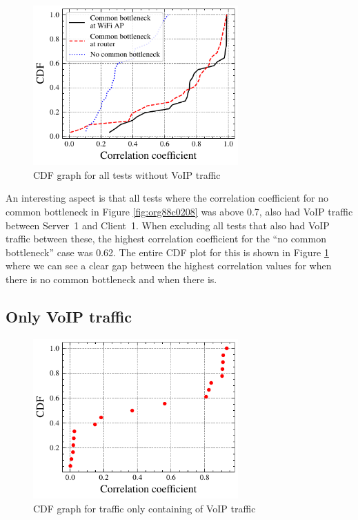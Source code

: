 \documentclass[a4paper,11pt]{article}
\begin{document}
\begin{figure}[htbp]
\centering
\includegraphics[width=0.7\textwidth]{figures/results/all-over2-no-video.pdf}
\caption{\label{fig:orgee47d20}CDF graph for all tests without VoIP traffic}
\end{figure}

An interesting aspect is that all tests where the correlation coefficient for no common bottleneck in Figure \ref{fig:org88c0208} was above 0.7, also had VoIP traffic between Server~1 and Client~1. When excluding all tests that also had VoIP traffic between these, the highest correlation coefficient for the ``no common bottleneck'' case was 0.62. The entire CDF plot for this is shown in Figure \ref{fig:orgee47d20} where we can see a clear gap between the highest correlation values for when there is no common bottleneck and when there is.
\subsection{Only VoIP traffic}
\label{sec:orge548f9f}
\begin{figure}[htbp]
\centering
\includegraphics[width=0.7\textwidth]{figures/results/only-video-combined.pdf}
\caption{\label{fig:org557a00e}CDF graph for traffic only containing of VoIP traffic}
\end{figure}
\end{document}
